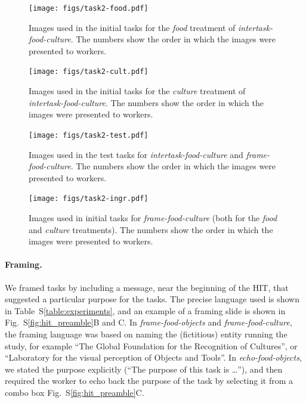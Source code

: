 \documentclass[12pt]{article}
\begin{document}
\begin{figure}
	\begin{center}
	\texttt{[image: figs/task2-food.pdf]}
	\end{center}
	\caption{
		Images used in the initial tasks for the
		\textit{food} treatment of \textit{intertask-food-culture}.  
		The numbers show the order in which the 
		images were presented to workers.
	}
	\label{fig:task2:food}
\end{figure}

\begin{figure}
	\begin{center}
	\texttt{[image: figs/task2-cult.pdf]}
	\end{center}
	\caption{
		Images used in the initial tasks for the
		\textit{culture} treatment of \textit{intertask-food-culture}.  
		The numbers show the order in which the 
		images were presented to workers.
	}
	\label{fig:task2:cult}
\end{figure}

\begin{figure}
	\begin{center}
	\texttt{[image: figs/task2-test.pdf]}
	\end{center}
	\caption{
		Images used in the test tasks for \textit{intertask-food-culture} 
		and \textit{frame-food-culture}.  
		The numbers show the order in which the 
		images were presented to workers.
	}
	\label{fig:task2:test}
\end{figure}

\begin{figure}
	\begin{center}
		\texttt{[image: figs/task2-ingr.pdf]}
	\end{center}
	\caption{
		Images used in initial tasks for \textit{frame-food-culture} 
		(both for the \textit{food} and \textit{culture} treatments).
		The numbers show the order in which the images were presented to 
		workers.
	}
	\label{fig:frame2:ingr}
\end{figure}

\paragraph{Framing.}
We framed tasks by including a message, near the beginning of the HIT, that 
suggested a particular purpose for the tasks.
The precise language used is shown in 
Table~S\ref{table:experiments}, and an example of a framing slide is shown in
Fig.~S\ref{fig:hit_preamble}B and C.  In \textit{frame-food-objects}
and \textit{frame-food-culture}, the framing language was based on
naming the (fictitious) entity running the study, for example
``The Global Foundation for the Recognition of Cultures'',
or ``Laboratory for the visual perception of Objects and Tools''.
In \textit{echo-food-objects}, we stated the purpose explicitly 
(``The purpose of this task is \dots''), and then required the worker to
echo back the purpose of the task by selecting it from a combo box
Fig.~S\ref{fig:hit_preamble}C.
\end{document}
